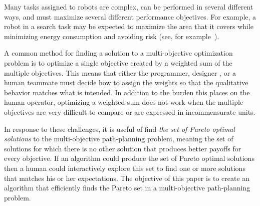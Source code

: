 \documentclass{article}
\begin{document}
Many tasks assigned to robots are complex, can be performed in several different ways, and must maximize several different performance objectives.  
For example, a robot in a search task may be expected to maximize the area that it covers while minimizing energy consumption and avoiding risk (see, for example~\cite{mei2005deployment,yi2014supporting}). 

A common method for finding a solution to a multi-objective optimization problem is to optimize a single objective created by a weighted sum of the multiple objectives.  
This means that either the programmer, designer , or a human teammate 
must decide how to assign the weights so that the qualitative behavior matches what is intended.  
In addition to the burden this places on the human operator, optimizing a weighted sum does not work when the multiple objectives are very difficult to compare or are expressed in incommensurate units.

In response to these challenges, it is useful of find {\em the set of
Pareto optimal solutions
} to the multi-objective path-planning problem, meaning the set of solutions for which there is no other solution that produces better payoffs for every objective.   
If an algorithm could produce the set of Pareto optimal solutions then a human could interactively explore this set to find one or more solutions that matches his or her expectations. 
The objective of this paper is to create an algorithm that efficiently finds the Pareto set in a multi-objective path-planning problem.
\end{document}
